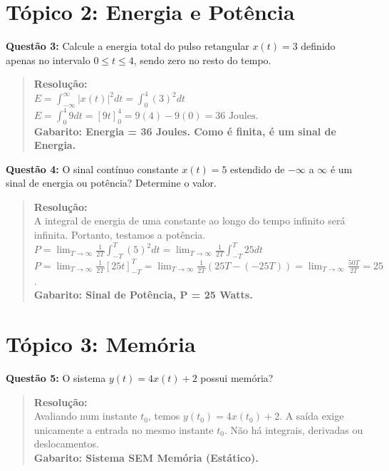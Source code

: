 \section{Tópico 2: Energia e Potência}\label{tuxf3pico-2-energia-e-potuxeancia}

\textbf{Questão 3:} Calcule a energia total do pulso retangular \(x(t) = 3\) definido apenas no intervalo \(0 \le t \le 4\), sendo zero no resto do tempo.

\begin{quote}
\textbf{Resolução:}\\
\(E = \int_{-\infty}^{\infty} |x(t)|^2 dt = \int_{0}^{4} (3)^2 dt\)\\
\(E = \int_{0}^{4} 9 dt = [9t]_0^4 = 9(4) - 9(0) = 36 \text{ Joules}\).\\
\textbf{Gabarito: Energia = 36 Joules. Como é finita, é um sinal de Energia.}
\end{quote}

\textbf{Questão 4:} O sinal contínuo constante \(x(t) = 5\) estendido de \(-\infty\) a \(\infty\) é um sinal de energia ou potência? Determine o valor.

\begin{quote}
\textbf{Resolução:}\\
A integral de energia de uma constante ao longo do tempo infinito será infinita. Portanto, testamos a potência.\\
\(P = \lim_{T \to \infty} \frac{1}{2T} \int_{-T}^{T} (5)^2 dt = \lim_{T \to \infty} \frac{1}{2T} \int_{-T}^{T} 25 dt\)\\
\(P = \lim_{T \to \infty} \frac{1}{2T} [25t]_{-T}^{T} = \lim_{T \to \infty} \frac{1}{2T} (25T - (-25T)) = \lim_{T \to \infty} \frac{50T}{2T} = 25\).\\
\textbf{Gabarito: Sinal de Potência, P = 25 Watts.}
\end{quote}

\section{Tópico 3: Memória}\label{tuxf3pico-3-memuxf3ria}

\textbf{Questão 5:} O sistema \(y(t) = 4x(t) + 2\) possui memória?

\begin{quote}
\textbf{Resolução:}\\
Avaliando num instante \(t_0\), temos \(y(t_0) = 4x(t_0) + 2\). A saída exige unicamente a entrada no mesmo instante \(t_0\). Não há integrais, derivadas ou deslocamentos.\\
\textbf{Gabarito: Sistema SEM Memória (Estático).}
\end{quote}

